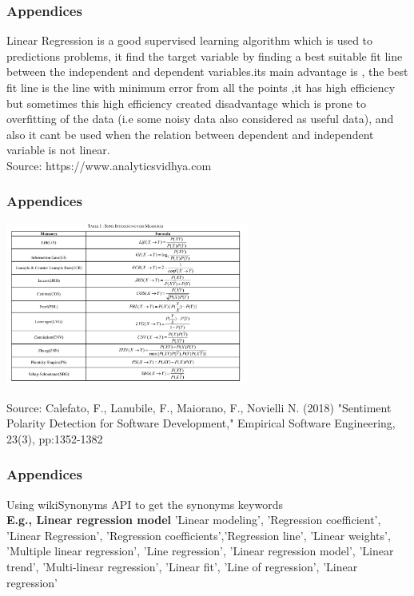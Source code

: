 \documentclass{beamer}
\begin{document}
\begin{frame}
\frametitle{Appendices}
Linear Regression is a good supervised learning algorithm which is used to predictions problems, it find the target variable by finding a best suitable fit line between the independent and dependent variables.its main advantage is , the best fit line is the line with minimum error from all the points ,it has high efficiency but sometimes this high efficiency created disadvantage which is prone to overfitting of the data (i.e some noisy data also considered as useful data), and also it cant be used when the relation between dependent and independent variable is not linear. \\

{\tiny Source: https://www.analyticsvidhya.com}
\end{frame}
\begin{frame}
\frametitle{Appendices}
\begin{center}
	\includegraphics[width=80mm]{mmm.png} 
\end{center}
{\tiny Source:  Calefato, F., Lanubile, F., Maiorano, F., Novielli N. (2018) "Sentiment Polarity Detection for Software Development," Empirical Software Engineering, 23(3), pp:1352-1382}
\end{frame}
\begin{frame}
\frametitle{Appendices}
Using wikiSynonyms API to get the synonyms keywords \\
\textbf{E.g., Linear regression model }{'Linear modeling', 'Regression coefficient', 'Linear Regression', 'Regression coefficients','Regression line',  'Linear weights', 'Multiple linear regression', 'Line regression', 'Linear regression model', 'Linear trend', 'Multi-linear regression', 'Linear fit', 'Line of regression', 'Linear regression'}

\end{frame}
\end{document}
